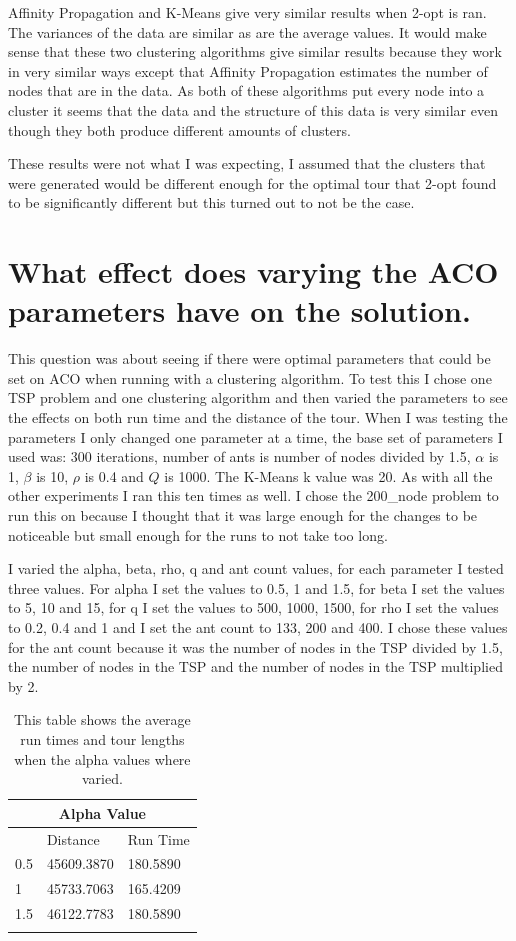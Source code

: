 Affinity Propagation and K-Means give very similar results when 2-opt is ran. The variances of the data are similar as are the average values. It would make sense that these two clustering algorithms give similar results because they work in very similar ways except that Affinity Propagation estimates the number of nodes that are in the data. As both of these algorithms put every node into a cluster it seems that the data and the structure of this data is very similar even though they both produce different amounts of clusters.

These results were not what I was expecting, I assumed that the clusters that were generated would be different enough for the optimal tour that 2-opt found to be significantly different but this turned out to not be the case.

\section{What effect does varying the ACO parameters have on the solution.}

This question was about seeing if there were optimal parameters that could be set on ACO when running with a clustering algorithm. To test this I chose one TSP problem and one clustering algorithm and then varied the parameters to see the effects on both run time and the distance of the tour. When I was testing the parameters I only changed one parameter at a time, the base set of parameters I used was: 300 iterations, number of ants is number of nodes divided by 1.5, $\alpha$ is 1, $\beta$ is 10, $\rho$ is 0.4 and $Q$ is 1000. The K-Means k value was 20. As with all the other experiments I ran this ten times as well. I chose the 200\_node problem to run this on because I thought that it was large enough for the changes to be noticeable but small enough for the runs to not take too long.

I varied the alpha, beta, rho, q and ant count values, for each parameter I tested three values. For alpha I set the values to 0.5, 1 and 1.5, for beta I set the values to 5, 10 and 15, for q I set the values to 500, 1000, 1500, for rho I set the values to 0.2, 0.4 and 1 and I set the ant count to 133, 200 and 400. I chose these values for the ant count because it was the number of nodes in the TSP divided by 1.5, the number of nodes in the TSP and the number of nodes in the TSP multiplied by 2.

\begin{longtable}[c]{|l|l|l|}
\hline
\multicolumn{3}{|c|}{Alpha Value} \\ \hline
\endhead
%
     & Distance     & Run Time    \\ \hline
0.5  & 45609.3870   & 180.5890    \\ \hline
1    & 45733.7063   & 165.4209   \\ \hline
1.5  & 46122.7783  & 180.5890 \\ \hline
\caption{This table shows the average run times and tour lengths when the alpha values where varied.}
\label{tab:alpha_aco_table}\\
\end{longtable}

